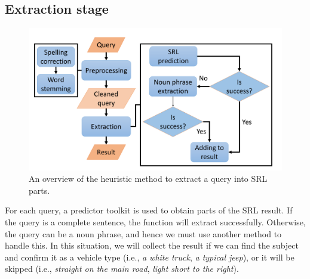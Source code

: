 \subsection{Extraction stage}
\begin{figure}[!htb]
    \centering
    \includegraphics[width=\textwidth]{images/methods/stage_2_overview.pdf}
    \caption{An overview of the heuristic method to extract a query into SRL parts.}
    \label{fig:text_branch_stage_2_overview}
\end{figure}
For each query, a predictor toolkit is used to obtain parts of the SRL result. If the query is a complete sentence, the function will extract successfully. Otherwise, the query can be a noun phrase, and hence we must use another method to handle this. In this situation, we will collect the result if we can find the subject and confirm it as a vehicle type (i.e., \textit{a white truck}, \textit{a typical jeep}), or it will be skipped (i.e., \textit{straight on the main road}, \textit{light short to the right}).


